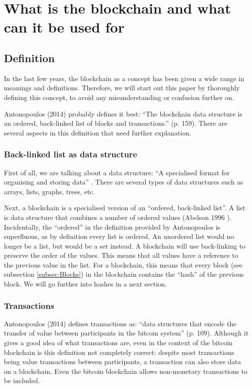 \chapter{What is the blockchain and what can it be used for}

\section{Definition}
In the last few years, the blockchain as a concept has been given a wide range in meanings and definitions. Therefore, we will start out this paper by thoroughly defining this concept, to avoid any misunderstanding or confusion further on.

Antonopoulos (2014) \cite{antonopoulos:2014} probably defines it best: ``The blockchain data structure is an ordered, back-linked list of blocks and transactions.'' (p. 159). There are several aspects in this definition that need further explanation.

\subsection{Back-linked list as data structure}

First of all, we are talking about a data structure: ``A specialised format for organising and storing data'' \cite{data-structure}. There are several types of data structures such as arrays, lists, graphs, trees, etc.

Next, a blockchain is a specialised version of an ``ordered, back-linked list''. A list is data structure that combines a number of ordered values (Abelson 1996 \cite{abelson:1996}).  Incidentally, the ``ordered'' in the definition provided by Antonopoulos is superfluous, as by definition every list is ordered. An unordered list would no longer be a list, but would be a set instead. A blockchain will use back-linking to preserve the order of the values. This means that all values have a reference to the previous value in the list. For a blockchain, this means that every block (see subsection \ref{subsec:Blocks}) in the blockchain contains the ``hash'' of the previous block. We will go further into hashes in a next section.

\subsection{Transactions}

Antonopoulos (2014) \cite{antonopoulos:2014} defines transactions as: ``data structures that encode the transfer of value between participants in the bitcoin system'' (p. 109). Although it gives a good idea of what transactions are, even in the context of the bitcoin blockchain is this definition not completely correct: despite most transactions being value transactions between participants, a transaction can also store data on a blockchain. Even the bitcoin blockchain allows non-monetary transactions to be included.

